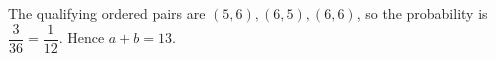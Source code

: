 The qualifying ordered pairs are $(5,6),(6,5),(6,6)$, so the probability is $\dfrac{3}{36}=\dfrac{1}{12}$. Hence $\boxed{a+b=13}$.
